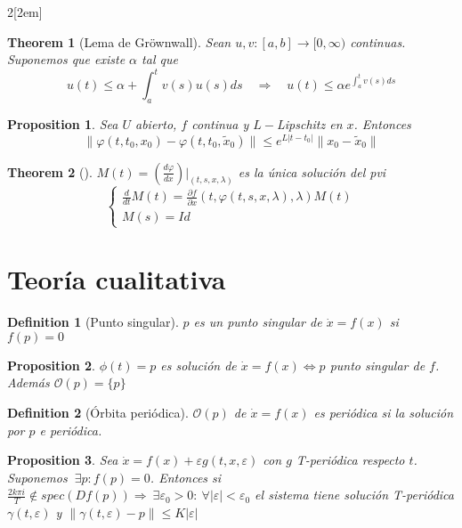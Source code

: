 \documentclass{myclass}
\newtheorem*{definition}{Definition}
\newtheorem*{theorem}{Theorem}
\newtheorem*{proposition}{Proposition}
\begin{document}
\begin{multicols}{2}[\columnsep2em]
\begin{theorem}[Lema de Gröwnwall]
Sean $u, v: [a,b]\to [0, \infty)$ continuas. Suponemos que existe $\alpha $ tal que
\[
u(t) \le \alpha + \int_{a}^t v(s)u(s)ds \quad \Rightarrow \quad u(t) \le \alpha e^{\int_a^tv(s)ds}
\] 
\end{theorem}

\begin{proposition} Sea $U$ abierto, $f$ continua y $L-$Lipschitz en  $x$. Entonces
  \[
  \|\varphi (t, t_0, x_0)-\varphi (t, t_0, \tilde{x}_0)\| \le e^{L|t-t_0|}\|x_0-\tilde{x}_0\|
  \] 
\end{proposition}

\begin{theorem}[] $M(t) = (\frac{d \varphi }{d x} )|_{(t,s,x,\lambda)}$ es la única solución del pvi
\[
  \begin{cases}
\frac{d }{d t} M(t) = \frac{\partial f}{\partial x}(t, \varphi (t,s,x,\lambda), \lambda) M(t)\\
M(s)=Id
  \end{cases}
\] 
\end{theorem}


\section{Teoría cualitativa}
\begin{definition}[Punto singular]
$p$ es un punto singular de $\dot{x}=f(x)$ si $f(p) = 0$
\end{definition}

\begin{proposition}
$\phi(t) = p$ es solución de $\dot{x}=f(x) \iff p$ punto singular de $f$. Además $\mathcal{O}(p)=\{p\}$
\end{proposition}

\begin{definition}[Órbita periódica]
$\mathcal{O}(p)$ de $\dot{x} = f(x)$ es periódica si la solución por $p$ e periódica.
\end{definition}

\begin{proposition}
Sea $\dot{x} = f(x)+ \varepsilon  g(t, x, \varepsilon )$ con $g$ T-periódica respecto  $t$. Suponemos  $\ \exists p: f(p)=0$. Entonces si $ \frac{2k\pi i}{T} \not\in spec(Df(p)) \Rightarrow \ \exists \varepsilon_0 >0 : \ \forall |\varepsilon |<\varepsilon _0$ el sistema tiene solución T-periódica $\gamma (t, \varepsilon )$ y $\|\gamma (t, \varepsilon )-p\|\le K|\varepsilon |$
\end{proposition}


\end{multicols}
\end{document}
